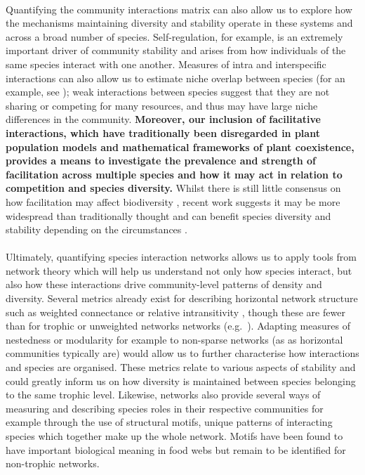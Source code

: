 \documentclass[a4,12pt]{article}
\begin{document}
\begin{refsection}
    \paragraph{}
    Quantifying the community interactions matrix can also allow us to explore how the mechanisms maintaining diversity and stability operate in these systems and across a broad number of species. Self-regulation, for example, is an extremely important driver of community stability \parencite{Barabas2017} and arises from how individuals of the same species interact with one another.     Measures of intra and interspecific interactions can also allow us to estimate niche overlap between species (for an example, see \cite{Chu2015a}); weak interactions between species suggest that they are not sharing or competing for many resources, and thus may have large niche differences in the community. \textbf{Moreover, our inclusion of facilitative interactions, which have traditionally been disregarded in plant population models and mathematical frameworks of plant coexistence, provides a means to investigate the prevalence and strength of facilitation across multiple species and how it may act in relation to competition and species diversity.} Whilst there is still little consensus on how facilitation may affect biodiversity \parencite{Bruno2003, Brooker2008}, recent work suggests it may be more widespread than traditionally thought \parencite{Gross2015, Picoche2020} and can benefit species diversity and stability depending on the circumstances \parencite{Coyte2015, Brooker2008}.

    \paragraph{}
    Ultimately, quantifying species interaction networks allows us to apply tools from network theory which will help us understand not only how species interact, but also how these interactions drive community-level patterns of density and diversity. Several metrics already exist for describing horizontal network structure such as weighted connectance \parencite{Ulanowicz1991} or relative intransitivity \parencite{Laird2006a}, though these are fewer than for trophic or unweighted networks networks (e.g.\ \cite{Bersier2002, Delmas2019}). Adapting measures of nestedness or modularity for example to non-sparse networks (as as horizontal communities typically are) would allow us to further characterise how interactions and species are organised. These metrics relate to various aspects of stability and could greatly inform us on how diversity is maintained between species belonging to the same trophic level. Likewise, networks also provide several ways of measuring and describing species roles in their respective communities \parencite{Cirtwill2018a} for example through the use of structural motifs, unique patterns of interacting species which together make up the whole network. Motifs have been found to have important biological meaning in food webs \parencite{Bascompte2005a} but remain to be identified for non-trophic networks. 



\end{refsection}
\end{document}
